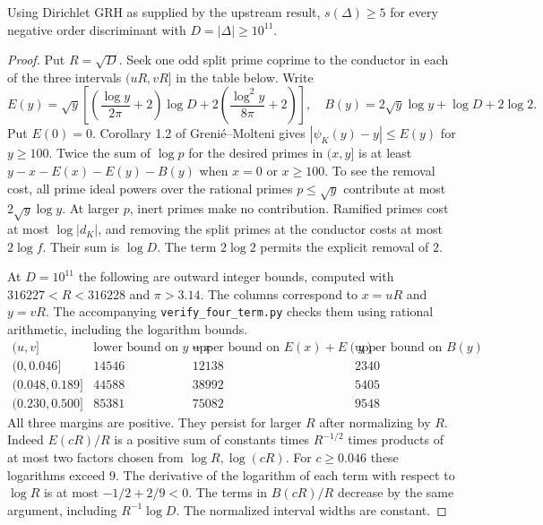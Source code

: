 \begin{theorem}
Using Dirichlet GRH as supplied by the upstream result,
$s(\Delta)\ge5$ for every negative order discriminant with
$D=|\Delta|\ge10^{11}$.
\end{theorem}
\begin{proof}
Put $R=\sqrt D$. Seek one odd split prime coprime to the conductor in
each of the three intervals $(uR,vR]$ in the table below. Write
\[
 E(y)=\sqrt y\left[\left(\frac{\log y}{2\pi}+2\right)\log D+
                  2\left(\frac{\log^2 y}{8\pi}+2\right)\right],
 \quad B(y)=2\sqrt y\log y+\log D+2\log2 .
\]
Put $E(0)=0$. Corollary 1.2 of Greni\'e--Molteni gives
$|\psi_K(y)-y|\le E(y)$ for $y\ge100$.
Twice the sum of $\log p$ for the desired primes in $(x,y]$ is at least
$y-x-E(x)-E(y)-B(y)$ when $x=0$ or $x\ge100$.
To see the removal cost, all prime ideal powers over the rational primes
$p\le\sqrt y$ contribute at most $2\sqrt y\log y$. At larger $p$,
inert primes make no contribution. Ramified primes cost at most
$\log|d_K|$, and removing the split primes at the conductor costs at most
$2\log f$. Their sum is $\log D$. The term $2\log 2$ permits the
explicit removal of $2$.

At $D=10^{11}$ the following are outward integer bounds, computed with
$316227<R<316228$ and $\pi>3.14$. The columns correspond to $x=uR$ and
$y=vR$. The accompanying \texttt{verify\_four\_term.py} checks them using
rational arithmetic, including the logarithm bounds.
\[
\begin{array}{c|r|r|r}
 (u,v] & \text{lower bound on }y-x & \text{upper bound on }E(x)+E(y)
      & \text{upper bound on }B(y) \\ \hline
 (0,0.046]       &14546&12138&2340\\
 (0.048,0.189]   &44588&38992&5405\\
 (0.230,0.500]   &85381&75082&9548
\end{array}
\]
All three margins are positive. They persist for larger $R$ after
normalizing by $R$. Indeed $E(cR)/R$ is a positive sum of constants
times $R^{-1/2}$ times products of at most two factors chosen from
$\log R,\log(cR)$. For $c\ge0.046$ these logarithms exceed $9$.
The derivative of the logarithm of each term with respect to $\log R$
is at most $-1/2+2/9<0$. The terms in $B(cR)/R$ decrease by the same
argument, including $R^{-1}\log D$. The normalized interval widths are
constant.


\end{proof}
